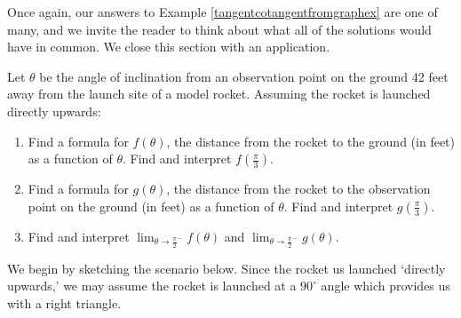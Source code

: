 \documentclass{ximera}
\begin{document}
Once again, our answers to Example \ref{tangentcotangentfromgraphex} are one of many, and we invite the reader to think about what all of the solutions would have in common.  We close this section with an application.

\begin{example} \label{modelrocketsecanttangentex}  Let $\theta$ be the angle of inclination from an observation point on the ground 42 feet away from the launch site of a model rocket.  Assuming the rocket is launched directly upwards:

\begin{enumerate}

\item  Find a formula for  $f(\theta)$, the distance from the rocket to the ground (in feet) as a function of  $\theta$.  Find and interpret  $f\left( \frac{\pi}{3} \right)$.

\item  Find a formula for  $g(\theta)$, the distance from the rocket to the observation point on the ground (in feet) as a function of  $\theta$.   Find and interpret  $g\left( \frac{\pi}{3} \right)$.

\item  Find and interpret $\lim_{\theta \rightarrow \frac{\pi}{2}^{-}} f(\theta)$ and $\lim_{\theta \rightarrow \frac{\pi}{2}^{-}} g(\theta)$.
\end{enumerate}

\begin{explanation}

We begin by sketching the scenario below.  Since the rocket us launched `directly upwards,' we may assume the rocket is launched at a $90^{\circ}$ angle which provides us with a right triangle.  

\begin{image}
\end{image}
\end{explanation}
\end{example}
\end{document}

